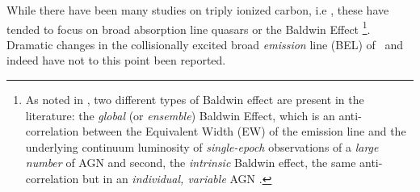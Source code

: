 \documentclass[fleqn,usenatbib]{mnras}
\begin{document}
While there have been many studies on triply ionized carbon, i.e
\civ, these have tended to focus on broad absorption line quasars
\citep[BAL quasars; see Table 1 of][]{Hemler2019} or the Baldwin Effect
\citep[BEff; ][]{Baldwin1977, Bian2012, Jensen2016,
Hamann2017}\footnote{As noted in \citet{Rakic2017}, two different
types of Baldwin effect are present in the literature: the {\it
global} (or {\it ensemble}) Baldwin Effect, which is an
anti-correlation between the Equivalent Width (EW) of the emission line and the
underlying continuum luminosity of {\it single-epoch} observations of
a {\it large number} of AGN and second, the {\it intrinsic} Baldwin
effect, the same anti-correlation but in an {\it individual, variable}
AGN \citep{PoggePeterson1992}.}.  Dramatic changes in the
collisionally excited broad {\it emission} line (BEL) of \civ\ and
indeed \ciii have not to this point been reported.
\end{document}
